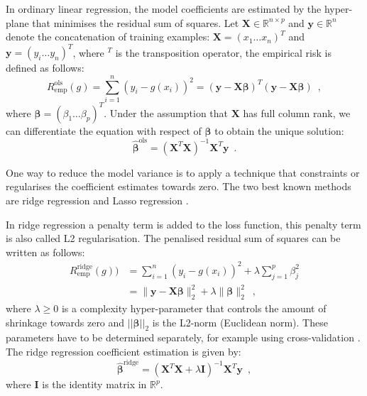 In ordinary linear regression, the model coefficients are estimated by the hyper-plane that minimises the residual sum of squares. Let $\mathbf{X} \in \mathds{R}^{n \times p}$ and $\mathbf{y} \in \mathds{R}^n$ denote the concatenation of training examples: $\mathbf{X}=(x_1 \ldots x_n)^T$ and $\mathbf{y}=(y_i \ldots y_n)^T$, where $^T$ is the transposition operator, the empirical risk is defined as follows:
\begin{equation*}
     R_\mathrm{emp}^\mathrm{ols}(g) = \sum_{i=1}^{n}(y_i -g(x_i))^2 = (\mathbf{y} - \mathbf{X}\boldsymbol{\beta})^T(\mathbf{y} - \mathbf{X}\boldsymbol{\beta})
    \enspace,
\end{equation*}
where $\boldsymbol{\beta}=(\beta_1 \ldots \beta_p)^T$.
Under the assumption that $\mathbf{X}$ has full column rank, we can differentiate the equation with respect of $\boldsymbol{\beta}$ to obtain the unique solution:
\begin{equation*}
    \hat{\boldsymbol{\beta}}^\mathrm{ols} = (\mathbf{X}^T\mathbf{X})^{-1}\mathbf{X}^T\mathbf{y}
    \enspace.
\end{equation*}

One way to reduce the model variance is to apply a technique that constraints or regularises the coefficient estimates towards zero. The two best known methods are ridge regression \citep{hoerl1970ridge} and Lasso regression \citep{tibshirani1996regression}. 

In ridge regression a penalty term is added to the loss function, this penalty term is also called L2 regularisation. The penalised residual sum of squares can be written as follows:
\begin{equation*}
\begin{aligned}
 R_\mathrm{emp}^\mathrm{ridge}(g)) & = \sum_{i=1}^{n}(y_i - g(x_i))^2 + \lambda\sum_{j=1}^{p}\beta^{2}_{j} \\
& = \|\mathbf{y} - \mathbf{X}\boldsymbol{\beta}\|_2^2 + \lambda\|\boldsymbol{\beta}\|_2^2
    \enspace,
\end{aligned}
\end{equation*}
where $ \lambda \geq 0 $ is a complexity hyper-parameter that controls the amount of shrinkage towards zero and $||\boldsymbol{\beta}||_2$ is the L2-norm (Euclidean norm). These parameters have to be determined separately, for example using cross-validation \citep{friedman2017elements}. The ridge regression coefficient estimation is given by:
\begin{equation*}
    \hat{\boldsymbol{\beta}}^\mathrm{ridge} = (\mathbf{X}^T\mathbf{X} + \lambda \mathbf{I})^{-1}\mathbf{X}^T\mathbf{y}
    \enspace,
\end{equation*}
where $\mathbf{I}$ is the identity matrix in $\mathbb{R}^p$.

